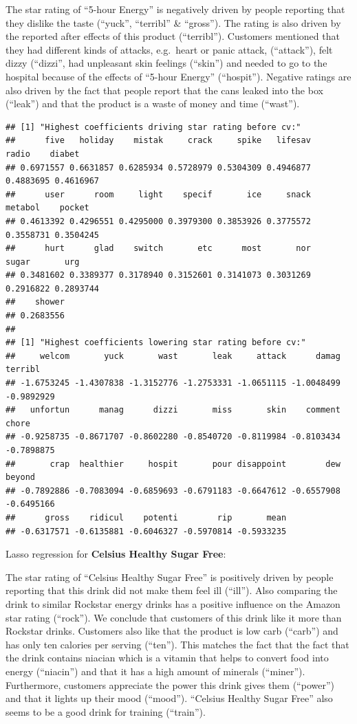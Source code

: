 \documentclass[
]{article}
\begin{document}
The star rating of ``5-hour Energy'' is negatively driven by people
reporting that they dislike the taste (``yuck'', ``terribl'' \&
``gross''). The rating is also driven by the reported after effects of
this product (``terribl''). Customers mentioned that they had different
kinds of attacks, e.g.~heart or panic attack, (``attack''), felt dizzy
(``dizzi'', had unpleasant skin feelings (``skin'') and needed to go to
the hospital because of the effects of ``5-hour Energy'' (``hospit'').
Negative ratings are also driven by the fact that people report that the
cans leaked into the box (``leak'') and that the product is a waste of
money and time (``wast''). \small

\begin{verbatim}
## [1] "Highest coefficients driving star rating before cv:"
##      five   holiday    mistak     crack     spike   lifesav     radio    diabet 
## 0.6971557 0.6631857 0.6285934 0.5728979 0.5304309 0.4946877 0.4883695 0.4616967 
##      user      room     light    specif       ice     snack   metabol    pocket 
## 0.4613392 0.4296551 0.4295000 0.3979300 0.3853926 0.3775572 0.3558731 0.3504245 
##      hurt      glad    switch       etc      most       nor     sugar       urg 
## 0.3481602 0.3389377 0.3178940 0.3152601 0.3141073 0.3031269 0.2916822 0.2893744 
##    shower 
## 0.2683556 
## 
## [1] "Highest coefficients lowering star rating before cv:"
##     welcom       yuck       wast       leak     attack      damag    terribl 
## -1.6753245 -1.4307838 -1.3152776 -1.2753331 -1.0651115 -1.0048499 -0.9892929 
##   unfortun      manag      dizzi       miss       skin    comment      chore 
## -0.9258735 -0.8671707 -0.8602280 -0.8540720 -0.8119984 -0.8103434 -0.7898875 
##       crap  healthier     hospit       pour disappoint        dew     beyond 
## -0.7892886 -0.7083094 -0.6859693 -0.6791183 -0.6647612 -0.6557908 -0.6495166 
##      gross    ridicul    potenti        rip       mean 
## -0.6317571 -0.6135881 -0.6046327 -0.5970814 -0.5933235
\end{verbatim}

\normalsize

Lasso regression for \textbf{Celsius Healthy Sugar Free}:

The star rating of ``Celsius Healthy Sugar Free'' is positively driven
by people reporting that this drink did not make them feel ill
(``ill''). Also comparing the drink to similar Rockstar energy drinks
has a positive influence on the Amazon star rating (``rock''). We
conclude that customers of this drink like it more than Rockstar drinks.
Customers also like that the product is low carb (``carb'') and has only
ten calories per serving (``ten''). This matches the fact that the fact
that the drink contains niacian which is a vitamin that helps to convert
food into energy (``niacin'') and that it has a high amount of minerals
(``miner''). Furthermore, customers appreciate the power this drink
gives them (``power'') and that it lights up their mood (``mood'').
``Celsius Healthy Sugar Free'' also seems to be a good drink for
training (``train'').
\end{document}
